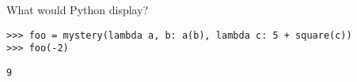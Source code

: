 \begin{blocksection}
\question What would Python display?

\begin{lstlisting}
>>> foo = mystery(lambda a, b: a(b), lambda c: 5 + square(c))
>>> foo(-2)
\end{lstlisting}

\begin{solution}
\begin{lstlisting}
9
\end{lstlisting}
\end{solution}
\end{blocksection}
